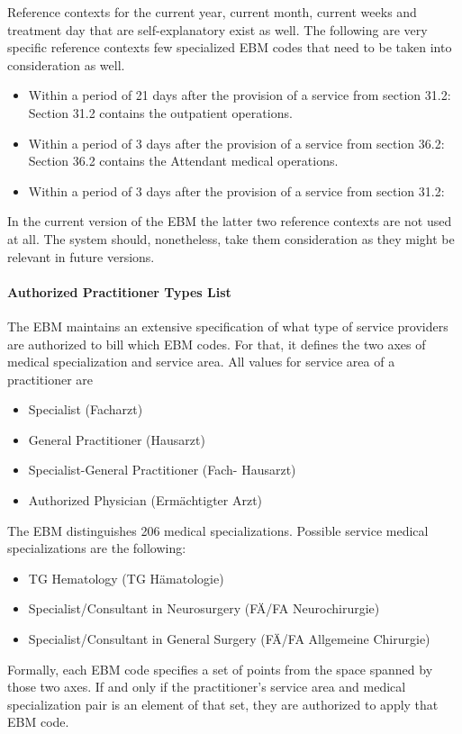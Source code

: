 Reference contexts for the current year, current month, current weeks and treatment day that are self-explanatory exist as well.
The following are very specific reference contexts few specialized EBM codes that need to be taken into consideration as well.
\begin{itemize}
    \item Within a period of 21 days after the provision of a service from section 31.2:
    Section 31.2 contains the \glqq outpatient operations\glqq.
    \item Within a period of 3 days after the provision of a service from section 36.2:
    Section 36.2 contains the \glqq Attendant medical operations\glqq.
    \item Within a period of 3 days after the provision of a service from section 31.2:
\end{itemize}
In the current version of the EBM the latter two reference contexts are not used at all.
The system should, nonetheless, take them consideration as they might be relevant in future versions.


\paragraph{Authorized Practitioner Types List}\label{par:authorized-practitioner-types-list}
The EBM maintains an extensive specification of what type of service providers are authorized to bill which EBM codes.
For that, it defines the two axes of medical specialization and service area.
All values for service area of a practitioner are
\begin{itemize}
    \item Specialist (Facharzt)
    \item General Practitioner (Hausarzt)
    \item Specialist-General Practitioner (Fach- Hausarzt)
    \item Authorized Physician (Ermächtigter Arzt)
\end{itemize}

The EBM distinguishes 206 medical specializations.
Possible service medical specializations are the following:
\begin{itemize}
    \item TG Hematology (TG Hämatologie)
    \item Specialist/Consultant in Neurosurgery (FÄ/FA Neurochirurgie)
    \item Specialist/Consultant in General Surgery (FÄ/FA Allgemeine Chirurgie)
\end{itemize}
Formally, each EBM code specifies a set of points from the space spanned by those two axes.
If and only if the practitioner's service area and medical specialization pair is an element of that set, they are authorized to apply that EBM code.


